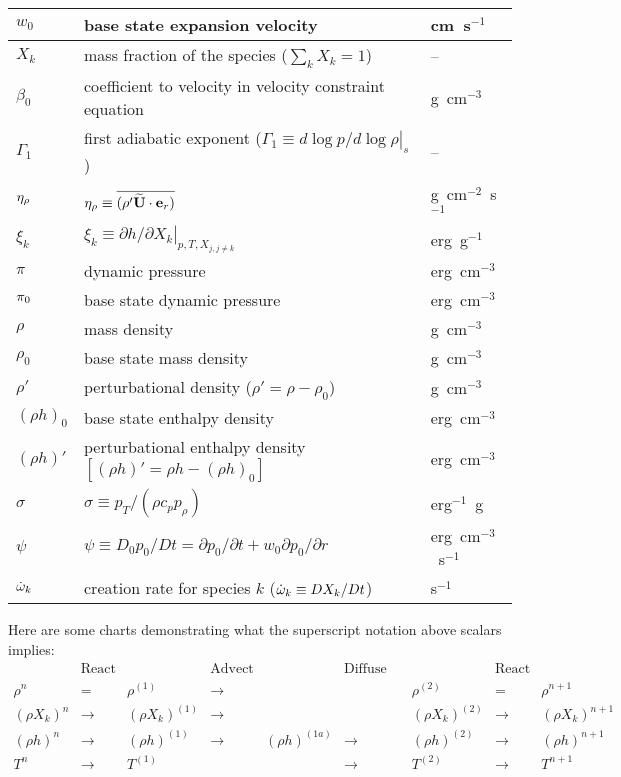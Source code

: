 \begin{center}
\begin{longtable}{|l|p{4.0in}|l|}
\hline
$w_0$   & base state expansion velocity              & cm~s$^{-1}$ \\
\hline
$X_k$   & mass fraction of the species ($\sum_k X_k = 1$) & -- \\
\hline
$\beta_0$ & coefficient to velocity
            in velocity constraint equation  & g~cm$^{-3}$ \\
\hline
$\Gamma_1$ & first adiabatic exponent ($\Gamma_1 \equiv \left . d \log p/d \log \rho \right |_s$) & -- \\
\hline
$\eta_{\rho}$ & $\eta_{\rho} \equiv \overline{(\rho' \widetilde{{\bf U}} \cdot {\bf e}_r)}$ & g~cm$^{-2}$~s$^{-1}$ \\
\hline
$\xi_k$ & $\xi_k \equiv \left . \partial h / \partial X_k \right |_{p,T,X_{j,j\ne k}}$ & erg~g$^{-1}$ \\
\hline 
$\pi$   & dynamic pressure & erg~cm$^{-3}$ \\
\hline
$\pi_0$ & base state dynamic pressure & erg~cm$^{-3}$ \\
\hline
$\rho$  & mass density  & g~cm$^{-3}$ \\
\hline
$\rho_0$  & base state mass density  & g~cm$^{-3}$ \\
\hline
$\rho'$  & perturbational density ($\rho' = \rho - \rho_0$) & g~cm$^{-3}$ \\
\hline
$(\rho h)_0$ & base state enthalpy density & erg~cm$^{-3}$  \\
\hline
$(\rho h)'$ & perturbational enthalpy density 
              $ \left [(\rho h)' = \rho h - (\rho h)_0 \right ]$ & erg~cm$^{-3}$  \\
\hline
$\sigma$ & $\sigma \equiv p_T/(\rho c_p p_\rho)$ & erg$^{-1}$~g \\
\hline
$\psi$  & $\psi \equiv D_0 p_0/Dt = \partial p_0/\partial t + w_0\partial p_0/\partial r$ & erg~cm$^{-3}$~s$^{-1}$ \\
\hline
$\dot{\omega}_k$ & creation rate for species $k$ ($\dot{\omega}_k \equiv DX_k/Dt$) & s$^{-1}$ \\
\end{longtable}
\end{center}
%
\renewcommand{\arraystretch}{1.0}
Here are some charts demonstrating what the superscript notation above scalars implies:
\begin{equation}
\left.\begin{array}{ccccccccc}
& \text{React State} & & \text{Advect State} & & \text{Diffuse Enthalpy} & & \text{React State} & \\
\rho^n & = & \rho^{(1)} & \longrightarrow & & & \rho^{(2)} & = & \rho^{n+1} \\
(\rho X_k)^n & \longrightarrow & (\rho X_k)^{(1)} & \longrightarrow & & & (\rho X_k)^{(2)} & \longrightarrow & (\rho X_k)^{n+1} \\
(\rho h)^n & \longrightarrow & (\rho h)^{(1)} & \longrightarrow & (\rho h)^{(1a)} & \longrightarrow & (\rho h)^{(2)} & \longrightarrow & (\rho h)^{n+1}\\
T^n & \longrightarrow & T^{(1)} & & & \longrightarrow & T^{(2)} & \longrightarrow & T^{n+1} \\
\end{array}\right.\nonumber
\end{equation}
